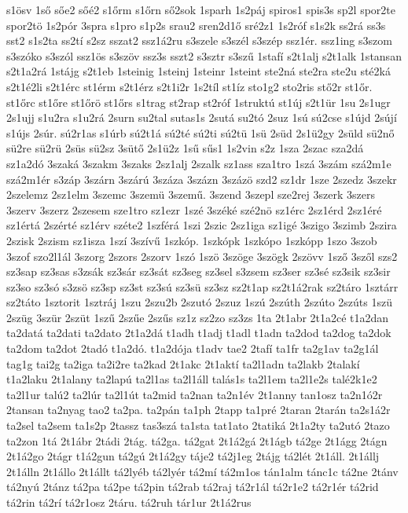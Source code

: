 {s1ösv
1ső
sőe2
sőé2
s1őrm
s1őrn
ső2sok
1sparh
1s2páj
spiros1
spis3s
sp2l
spor2te
spor2tö
1s2pór
3spra
s1pro
s1p2s
srau2
sren2d1ő
sré2z1
1s2róf
s1s2k
ss2rá
ss3s
sst2
s1s2ta
ss2tí
s2sz
sszat2
ssz1á2ru
s3szele
s3szél
s3szép
ssz1ér.
ssz1ing
s3szom
s3szóko
s3szól
ssz1ös
s3szöv
ssz3s
sszt2
s3sztr
s3szű
1stafí
s2t1alj
s2t1alk
1stansan
s2t1a2rá
1stájg
s2t1eb
1steinig
1steinj
1steinr
1steint
ste2ná
ste2ra
ste2u
sté2ká
s2t1é2li
s2t1érc
st1érm
s2t1érz
s2t1i2r
1s2tíl
st1íz
sto1g2
sto2ris
stő2r
st1őr.
st1őrc
st1őre
st1őrö
st1őrs
s1trag
st2rap
st2róf
1struktú
st1új
s2t1ür
1su
2s1ugr
2s1ujj
s1u2ra
s1u2rá
2surn
su2tal
sutas1s
2sutá
su2tó
2suz
1sú
sú2cse
s1újd
2sújí
s1újs
2súr.
sú2r1as
s1úrb
sú2t1á
sú2té
sú2ti
sú2tü
1sü
2süd
2s1ü2gy
2süld
sü2nő
sü2re
sü2rü
2süs
sü2sz
3sütő
2s1ü2z
1sű
sűs1
1s2vin
s2z
1sza
2szac
sza2dá
sz1a2dó
3szaká
3szakm
3szaks
2sz1alj
2szalk
sz1ass
sza1tro
1szá
3szám
szá2m1e
szá2m1ér
s3záp
3szárn
3szárú
3száza
3százn
3százö
szd2
sz1dr
1sze
2szedz
3szekr
2szelemz
2sz1elm
3szemc
3szemü
3szemű.
3szend
3szepl
sze2rej
3szerk
3szers
3szerv
3szerz
2szesem
sze1tro
sz1ezr
1szé
3széké
szé2nö
sz1érc
2sz1érd
2sz1éré
sz1értá
2szérté
sz1érv
széte2
1szférá
1szi
2szic
2sz1iga
sz1igé
3szigo
3szimb
2szira
2szisk
2szism
sz1isza
1szí
3szívű
1szkóp.
1szkópk
1szkópo
1szkópp
1szo
3szob
3szof
szo2l1ál
3szorg
2szors
2szorv
1szó
1szö
3szöge
3szögk
2szövv
1sző
3szől
szs2
sz3sap
sz3sas
s3zsák
sz3sár
sz3sát
sz3seg
sz3sel
s3zsem
sz3ser
sz3sé
sz3sik
sz3sir
sz3so
sz3só
s3zsö
sz3sp
sz3st
sz3sú
sz3sü
sz3sz
sz2t1ap
sz2t1á2rak
sz2táro
1sztárr
sz2táto
1sztorit
1sztráj
1szu
2szu2b
2szutó
2szuz
1szú
2szúth
2szúto
2szúts
1szü
2szüg
3szür
2szüt
1szű
2szűe
2szűs
sz1z
sz2zo
sz3zs
1ta
2t1abr
2t1a2cé
t1a2dan
ta2datá
ta2dati
ta2dato
2t1a2dá
t1adh
t1adj
t1adl
t1adn
ta2dod
ta2dog
ta2dok
ta2dom
ta2dot
2tadó
t1a2dó.
t1a2dója
t1adv
tae2
2tafí
ta1fr
ta2g1av
ta2g1ál
tag1g
tai2g
ta2iga
ta2i2re
ta2kad
2t1akc
2t1aktí
ta2l1adn
ta2lakb
2talakí
t1a2laku
2t1alany
ta2lapú
ta2l1as
ta2l1áll
talás1s
ta2l1em
ta2l1e2s
talé2k1e2
ta2l1ur
talú2
ta2lúr
ta2l1út
ta2mid
ta2nan
ta2n1év
2t1anny
tan1osz
ta2n1ó2r
2tansan
ta2nyag
tao2
ta2pa.
ta2pán
ta1ph
2tapp
ta1pré
2taran
2tarán
ta2s1á2r
ta2sel
ta2sem
ta1s2p
2tassz
tas3szá
ta1sta
tat1ato
2tatiká
2t1a2ty
ta2utó
2tazo
ta2zon
1tá
2t1ábr
2tádi
2tág.
tá2ga.
tá2gat
2t1á2gá
2t1ágb
tá2ge
2t1ágg
2tágn
2t1á2go
2tágr
t1á2gun
tá2gú
2t1á2gy
táje2
tá2j1eg
2tájg
tá2lét
2t1áll.
2t1állj
2t1álln
2t1állo
2t1állt
tá2lyéb
tá2lyér
tá2mí
tá2m1os
tán1alm
tánc1c
tá2ne
2tánv
tá2nyú
2tánz
tá2pa
tá2pe
tá2pin
tá2rab
tá2raj
tá2r1ál
tá2r1e2
tá2r1ér
tá2rid
tá2rin
tá2rí
tá2r1osz
2táru.
tá2ruh
tár1ur
2t1á2rus
}
